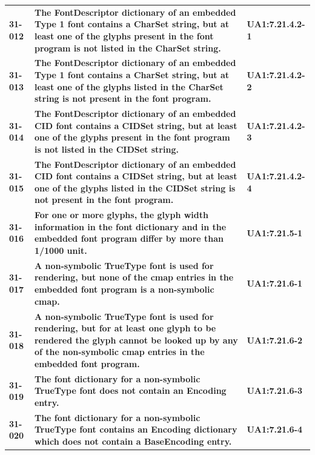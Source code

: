 \documentclass{book}
\begin{document}
\begin{longtable}{lp{10cm}l}
  \textbf{31-012} & \textbf{The FontDescriptor dictionary of an embedded Type 1 font contains a CharSet string, but at least one of the glyphs present in the font program is not listed in the CharSet string.} & \textbf{UA1:7.21.4.2-1}\\

  \textbf{31-013} & \textbf{The FontDescriptor dictionary of an embedded Type 1 font contains a CharSet string, but at least one of the glyphs listed in the CharSet string is not present in the font program.} & \textbf{UA1:7.21.4.2-2}\\

  \textbf{31-014} & \textbf{The FontDescriptor dictionary of an embedded CID font contains a CIDSet string, but at least one of the glyphs present in the font program is not listed in the CIDSet string.} & \textbf{UA1:7.21.4.2-3}\\

  \textbf{31-015} & \textbf{The FontDescriptor dictionary of an embedded CID font contains a CIDSet string, but at least one of the glyphs listed in the CIDSet string is not present in the font program.} & \textbf{UA1:7.21.4.2-4}\\

  \textbf{31-016} & \textbf{For one or more glyphs, the glyph width information in the font dictionary and in the embedded font program differ by more than 1/1000 unit.} & \textbf{UA1:7.21.5-1}\\

  \textbf{31-017} & \textbf{A non-symbolic TrueType font is used for rendering, but none of the cmap entries in the embedded font program is a non-symbolic cmap.} & \textbf{UA1:7.21.6-1}\\

  \textbf{31-018} & \textbf{A non-symbolic TrueType font is used for rendering, but for at least one glyph to be rendered the glyph cannot be looked up by any of the non-symbolic cmap entries in the embedded font program.} & \textbf{UA1:7.21.6-2}\\

  \textbf{31-019} & \textbf{The font dictionary for a non-symbolic TrueType font does not contain an Encoding entry.} & \textbf{UA1:7.21.6-3}\\

  \textbf{31-020} & \textbf{The font dictionary for a non-symbolic TrueType font contains an Encoding dictionary which does not contain a BaseEncoding entry.} & \textbf{UA1:7.21.6-4}\\


\end{longtable}
\end{document}

